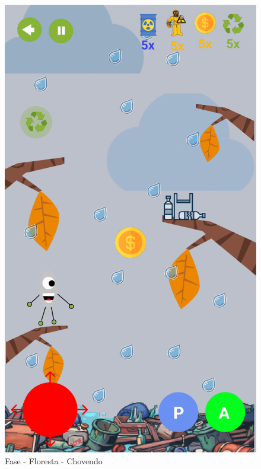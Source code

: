 \documentclass[]{scrartcl}
\begin{document}
\begin{figure}[H]
	\begin{center}
		\includegraphics[scale=0.3]{figs/Game Design-12.png}
		\caption{Fase - Floresta - Chovendo}
	\end{center}
\end{figure}
\end{document}
